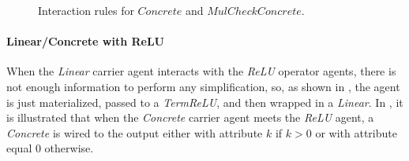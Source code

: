 \begin{figure}[H]
	\centering
	\caption{Interaction rules for $\mathit{Concrete}$ and $\mathit{MulCheckConcrete}$.}
	\label{fig:rule-concrete-mulcheckconcrete}
\end{figure}

\paragraph{Linear/Concrete with ReLU}
When the \textit{Linear} carrier agent interacts with the \textit{ReLU} operator agents, there is not
enough information to perform any simplification, so, as shown in \textbf{},
the agent is just materialized, passed to a \textit{TermReLU}, and then wrapped in a \textit{Linear}.
In \textbf{}, it is illustrated that when the \textit{Concrete} carrier agent
meets the \textit{ReLU} agent, a \textit{Concrete} is wired to the output either with attribute $k$
if $k>0$ or with attribute equal $0$ otherwise.

